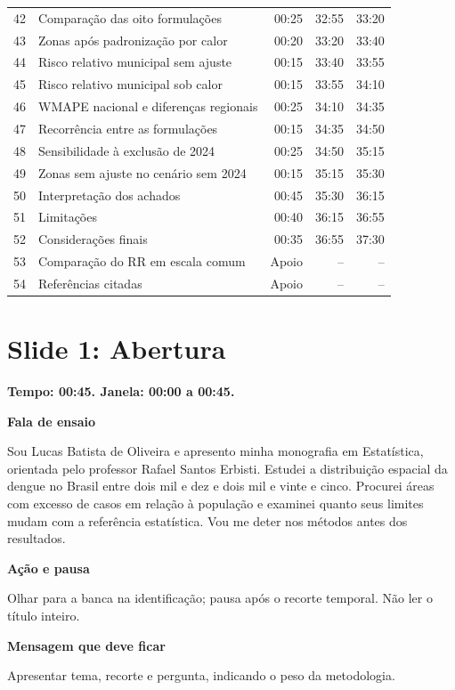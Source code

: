 \documentclass[11pt,a4paper]{article}
\newcommand{\bloco}[1]{\par\Needspace{3\baselineskip}\textbf{#1}\par}
\newcommand{\slide}[2]{\Needspace{13\baselineskip}\section*{Slide #1: #2}}
\begin{document}
{\begin{longtable}{@{}r p{8.1cm} r r r@{}}
42 & Comparação das oito formulações & 00:25 & 32:55 & 33:20\\
43 & Zonas após padronização por calor & 00:20 & 33:20 & 33:40\\
44 & Risco relativo municipal sem ajuste & 00:15 & 33:40 & 33:55\\
45 & Risco relativo municipal sob calor & 00:15 & 33:55 & 34:10\\
46 & WMAPE nacional e diferenças regionais & 00:25 & 34:10 & 34:35\\
47 & Recorrência entre as formulações & 00:15 & 34:35 & 34:50\\
48 & Sensibilidade à exclusão de 2024 & 00:25 & 34:50 & 35:15\\
49 & Zonas sem ajuste no cenário sem 2024 & 00:15 & 35:15 & 35:30\\
50 & Interpretação dos achados & 00:45 & 35:30 & 36:15\\
51 & Limitações & 00:40 & 36:15 & 36:55\\
52 & Considerações finais & 00:35 & 36:55 & 37:30\\
53 & Comparação do RR em escala comum & Apoio & -- & --\\
54 & Referências citadas & Apoio & -- & --\\
\end{longtable}}\clearpage
\par\begin{minipage}{\textwidth}
\slide{1}{Abertura}
{\color{azul}\textbf{Tempo: 00:45. Janela: 00:00 a 00:45.}}\par
\bloco{Fala de ensaio}
Sou Lucas Batista de Oliveira e apresento minha monografia em Estatística, orientada pelo professor Rafael Santos Erbisti. Estudei a distribuição espacial da dengue no Brasil entre dois mil e dez e dois mil e vinte e cinco. Procurei áreas com excesso de casos em relação à população e examinei quanto seus limites mudam com a referência estatística. Vou me deter nos métodos antes dos resultados.
\bloco{Ação e pausa}
Olhar para a banca na identificação; pausa após o recorte temporal. Não ler o título inteiro.
\bloco{Mensagem que deve ficar}
Apresentar tema, recorte e pergunta, indicando o peso da metodologia.
\end{minipage}\par\bigskip
\end{document}
